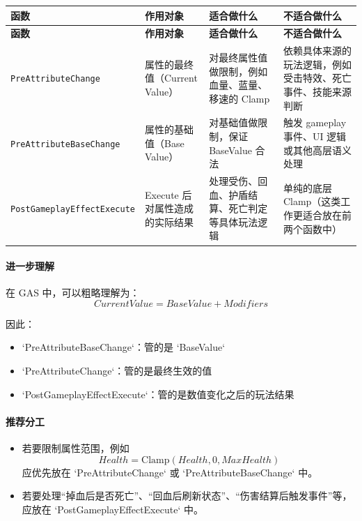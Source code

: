 \begin{center}
	\renewcommand{\arraystretch}{1.2}
	\footnotesize
	\begin{longtable}{|p{3.6cm}|p{3.2cm}|p{4.2cm}|p{4.2cm}|}
		\hline
		\textbf{函数} & \textbf{作用对象} & \textbf{适合做什么} & \textbf{不适合做什么} \\
		\hline
		\endfirsthead
		
		\hline
		\textbf{函数} & \textbf{作用对象} & \textbf{适合做什么} & \textbf{不适合做什么} \\
		\hline
		\endhead
		
		\hline
		\endfoot
		
		\hline
		\endlastfoot
		\texttt{PreAttributeChange}
		& 属性的最终值（Current Value）
		& 对最终属性值做限制，例如血量、蓝量、移速的 Clamp
		& 依赖具体来源的玩法逻辑，例如受击特效、死亡事件、技能来源判断 \\
		\hline
		
		\texttt{PreAttributeBaseChange}
		& 属性的基础值（Base Value）
		& 对基础值做限制，保证 BaseValue 合法
		& 触发 gameplay 事件、UI 逻辑或其他高层语义处理 \\
		\hline
		
		\texttt{PostGameplayEffectExecute}
		& Execute 后对属性造成的实际结果
		& 处理受伤、回血、护盾结算、死亡判定等具体玩法逻辑
		& 单纯的底层 Clamp（这类工作更适合放在前两个函数中） \\
		\hline
		
	\end{longtable}	
\end{center}

\paragraph{进一步理解}
在 GAS 中，可以粗略理解为：
\[
CurrentValue = BaseValue + Modifiers
\]

因此：

\begin{itemize}
	\item `PreAttributeBaseChange`：管的是 `BaseValue`
	\item `PreAttributeChange`：管的是最终生效的值
	\item `PostGameplayEffectExecute`：管的是数值变化之后的玩法结果
\end{itemize}

\paragraph{推荐分工}
\begin{itemize}
	\item 若要限制属性范围，例如
	\[
	Health = \mathrm{Clamp}(Health, 0, MaxHealth)
	\]
	应优先放在 `PreAttributeChange` 或 `PreAttributeBaseChange` 中。
	
	\item 若要处理“掉血后是否死亡”、“回血后刷新状态”、“伤害结算后触发事件”等，
	应放在 `PostGameplayEffectExecute` 中。
\end{itemize}

